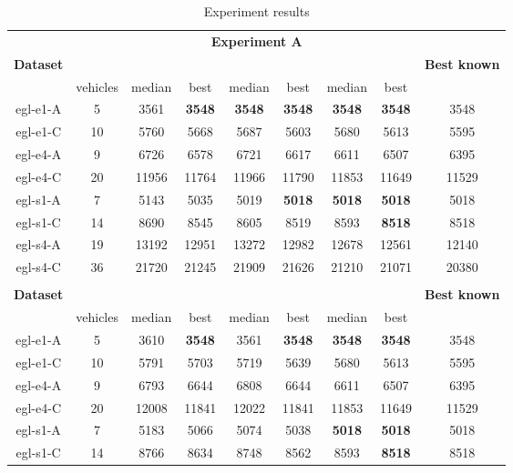 \documentclass[twoside]{ctuthesis}
\theoremstyle{plain}
\theoremstyle{definition}
\theoremstyle{note}
\begin{document}
\begin{table}[htbp]
	\centering
	\caption{Experiment results}
	\label{tab:tablebig}
	\begin{tabular}{|c|c|cc|cc|cc|c|}
		\hline
		\multicolumn{9}{|c|}{\textbf{Experiment A}}\\ 
		\multicolumn{1}{|c}{\textbf{Dataset}}&\multicolumn{1}{c}{}&\multicolumn{2}{c}{\textbf{\nnsrvanilla}}&\multicolumn{2}{c}{\textbf{\nnsrnode100}}&\multicolumn{2}{c}{\textbf{\nnsredge}}&\textbf{Best known} \\ \hline
		&vehicles&median&best&median&best&median&best& \\ \hline
		egl-e1-A &5&3561&\textbf{3548}&\textbf{3548}&\textbf{3548}&\textbf{3548}&\textbf{3548}&3548 \\ \hline
		egl-e1-C &10& 5760&5668&5687&5603&5680&5613&5595\\ \hline
		egl-e4-A &9& 6726&6578&6721&6617&6611&6507&6395\\ \hline
		egl-e4-C &20& 11956&11764&11966&11790&11853&11649&11529 \\ \hline
		egl-s1-A &7& 5143&5035&5019&\textbf{5018}&\textbf{5018}&\textbf{5018}&5018 \\ \hline
		egl-s1-C &14& 8690&8545&8605&8519&8593&\textbf{8518}&8518\\ \hline
		egl-s4-A &19& 13192&12951&13272&12982&12678&12561&12140 \\ \hline
		egl-s4-C &36& 21720&21245&21909&21626&21210&21071&20380\\ \hhline{|=========|}
		\multicolumn{9}{|c|}{\textbf{Experiment B}}\\ 
		\multicolumn{1}{|c}{\textbf{Dataset}}&\multicolumn{1}{c}{}&\multicolumn{2}{c}{\textbf{\nnsrbasic20}}&\multicolumn{2}{c}{\textbf{\nnsrnode20}}&\multicolumn{2}{c}{\textbf{\nnsredge}}&\textbf{Best known} \\ \hline
		&vehicles&median&best&median&best&median&best&\\ \hline
		egl-e1-A &5&3610&\textbf{3548}&3561&\textbf{3548}&\textbf{3548}&\textbf{3548}&3548\\ \hline
		egl-e1-C &10&5791&5703&5719&5639&5680&5613&5595\\ \hline
		egl-e4-A &9&6793&6644&6808&6644&6611&6507&6395\\ \hline
		egl-e4-C &20&12008&11841&12022&11841&11853&11649&11529\\ \hline
		egl-s1-A &7&5183&5066&5074&5038&\textbf{5018}&\textbf{5018}&5018\\ \hline
		egl-s1-C &14&8766&8634&8748&8562&8593&\textbf{8518}&8518\\ \hline

\end{tabular}
\end{table}
\end{document}
